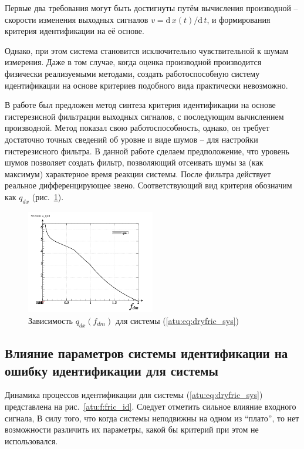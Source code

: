 Первые два требования
могут быть достигнуты путём вычисления производной --
скорости изменения выходных сигналов
\(v = \mathrm{d}\,x(t)/ \mathrm{d}\,t \),
и формирования критерия идентификации на её основе.

Однако, при этом система становится исключительно чувствительной
к шумам измерения. Даже в том случае, когда
оценка производной производится физически реализуемыми методами,
создать работоспособную систему идентификации на основе критериев
подобного вида практически невозможно.

В работе \cite{atu_asau11} был предложен метод синтеза критерия идентификации
на основе гистерезисной фильтрации выходных сигналов, с последующим
вычислением производной. Метод показал свою работоспособность, однако,
он требует достаточно точных сведений об уровне и виде шумов -- для
настройки гистерезисного фильтра. В данной работе сделаем предположение,
что уровень шумов позволяет создать фильтр, позволяющий отсеивать шумы
за (как максимум) характерное время реакции системы.
После фильтра действует реальное дифференцирующее звено.
Соответствующий вид критерия обозначим как $ q_{dx} $ (рис.~\ref{atu:f:fric_q}).



\begin{figure}[htb!]
\centerline{
  \includegraphics[width=0.50\textwidth]{p/cha/fric/fric_p-p_f_dm_q.png}
}
  \caption{Зависимость $q_{dx}(f_{dm})$ для системы (\ref{atu:eq:dryfric_sys}) }
\label{atu:f:fric_q}
\end{figure}




\subsection{Влияние параметров системы идентификации на ошибку идентификации для системы }  %



Динамика процессов идентификации для системы (\ref{atu:eq:dryfric_sys}) представлена на рис.~\ref{atu:f:fric_id}.
Следует отметить сильное влияние входного сигнала, В силу того, что когда системы неподвижны
на одном из ``плато'', то нет возможности различить их параметры,
какой бы критерий при этом не использовался.

